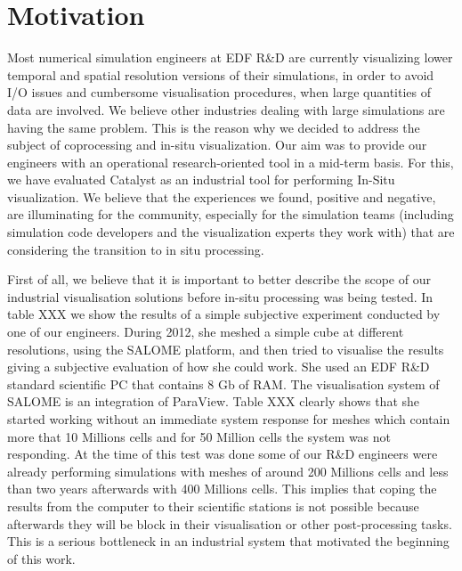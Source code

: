 \section{Motivation}
\label{sec:motivation}

Most numerical simulation engineers at EDF R\&D are currently visualizing lower
temporal and spatial resolution versions of their simulations, in order to avoid
I/O issues and cumbersome visualisation procedures, when large quantities of
data are involved. We believe other industries dealing with large simulations
are having the same problem. This is the reason why we decided to address the
subject of coprocessing and in-situ visualization. Our aim was to provide our
engineers with an operational research-oriented tool in a mid-term basis. For
this, we have evaluated Catalyst as an industrial tool for performing In-Situ
visualization. We believe that the experiences we found, positive and negative,
are illuminating for the community, especially for the simulation teams
(including simulation code developers and the visualization experts they work
with) that are considering the transition to in situ processing.

First of all, we believe that it is important to better describe the scope of
our industrial visualisation solutions before in-situ processing was being
tested. In table XXX we show the results of a simple subjective experiment
conducted by one of our engineers. During 2012, she meshed a simple cube at
different resolutions, using the SALOME platform, and then tried to visualise
the results giving a subjective evaluation of how she could work. She used an
EDF R\&D standard scientific PC that contains 8 Gb of RAM. The visualisation
system of SALOME is an integration of ParaView. Table XXX clearly shows that she
started working without an immediate system response for meshes which contain
more that 10 Millions cells and for 50 Million cells the system was not
responding. At the time of this test was done some of our R\&D engineers were
already performing simulations with meshes of around 200 Millions cells and less
than two years afterwards with 400 Millions cells. This implies that coping the
results from the computer to their scientific stations is not possible because
afterwards they will be block in their visualisation or other post-processing
tasks. This is a serious bottleneck in an industrial system that motivated the
beginning of this work.

